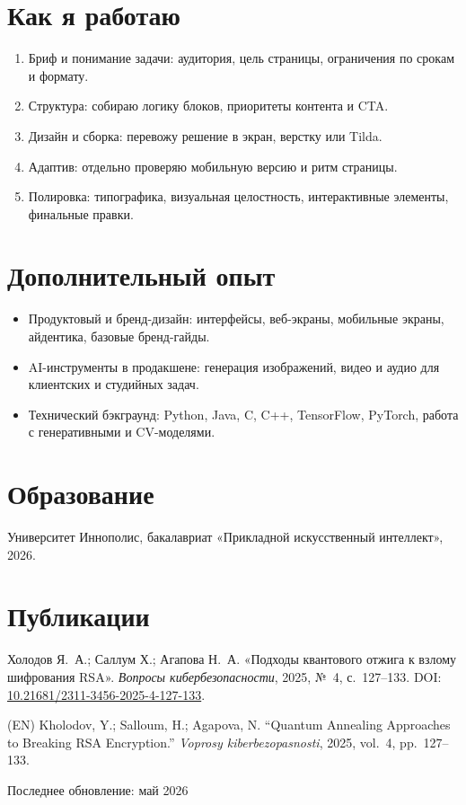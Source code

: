 \documentclass[11pt,a4paper]{article}
\begin{document}
\section*{Как я работаю}

\begin{enumerate}
  \item Бриф и понимание задачи: аудитория, цель страницы, ограничения по срокам и формату.
  \item Структура: собираю логику блоков, приоритеты контента и CTA.
  \item Дизайн и сборка: перевожу решение в экран, верстку или Tilda.
  \item Адаптив: отдельно проверяю мобильную версию и ритм страницы.
  \item Полировка: типографика, визуальная целостность, интерактивные элементы, финальные правки.
\end{enumerate}

\section*{Дополнительный опыт}

\begin{itemize}
  \item Продуктовый и бренд-дизайн: интерфейсы, веб-экраны, мобильные экраны, айдентика, базовые бренд-гайды.
  \item AI-инструменты в продакшене: генерация изображений, видео и аудио для клиентских и студийных задач.
  \item Технический бэкграунд: Python, Java, C, C++, TensorFlow, PyTorch, работа с генеративными и CV-моделями.
\end{itemize}

\section*{Образование}

Университет Иннополис, бакалавриат «Прикладной искусственный интеллект», 2026.

\section*{Публикации}

Холодов Я.~А.; Саллум Х.; Агапова Н.~А. «Подходы квантового отжига к взлому шифрования RSA». \textit{Вопросы кибербезопасности}, 2025, №~4, с.~127--133. DOI: \href{https://doi.org/10.21681/2311-3456-2025-4-127-133}{10.21681/2311-3456-2025-4-127-133}.

\vspace{0.4em}

\textcolor{textgray}{\small
(EN) Kholodov, Y.; Salloum, H.; Agapova, N. ``Quantum Annealing Approaches to Breaking RSA Encryption.'' \textit{Voprosy kiberbezopasnosti}, 2025, vol.~4, pp.~127--133.
}

\vfill

\begin{center}
\textcolor{textgray}{Последнее обновление: май 2026}
\end{center}
\end{document}
